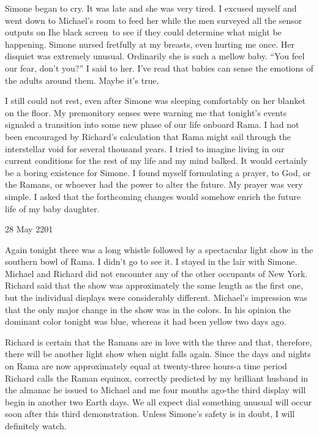 \documentclass[]{article}
\begin{document}
Simone began to cry.  It was late and she was very tired.  I excused myself and went down to Michael’s room to feed her while the men surveyed all the sensor outputs on Ihe black screen~to see if they could determine what might be happening.  Simone nursed fretfully at my breasts, even hurting me once.  Her disquiet was extremely unusual.  Ordinarily she is such a mellow baby.  “You feel our fear, don’t you?” I said to her.  I’ve read that babies can sense the emotions of the adults around them.  Maybe it’s true.

I still could not rest, even after Simone was sleeping comfortably on her blanket on the floor.  My premonitory senses were warning me that tonight’s events signaled a transition into some new phase of our life onboard Rama.  I had not been encouraged by Richard’s calculation that Rama might sail through the interstellar void for several thousand years.  I tried to imagine living in our current conditions for the rest of my life and my mind balked.  It would certainly be a boring existence for Simone.  I found myself formulating a prayer, to God, or the Ramans, or whoever had the power to alter the future.  My prayer was very simple.  I asked that the forthcoming changes would somehow enrich the future life of my baby daughter.

28 May 2201

Again tonight there was a long whistle followed by a spectacular light show in the southern bowl of Rama.  I didn’t go to see it.  I stayed in the lair with Simone.  Michael and Richard did not encounter any of the other occupants of New York.  Richard said that the show was approximately the same length as the first one, but the individual displays were considerably different.  Michael’s impression was that the only major change in the show was in the colors.  In his opinion the dominant color tonight was blue, whereas it had been yellow two days ago.

Richard is certain that the Ramans are in love with the three and that, therefore, there will be another light show when night falls again.  Since the days and nights on Rama are now approximately equal at twenty-three hours-a time period Richard calls the Raman equinox, correctly predicted by my brilliant husband in the almanac he issued to Michael and me four months ago-the third display will begin in another two Earth days.  We all expect dial something unusual will occur soon after this third demonstration.  Unless Simone’s safety is in doubt, I will definitely watch.
\end{document}
